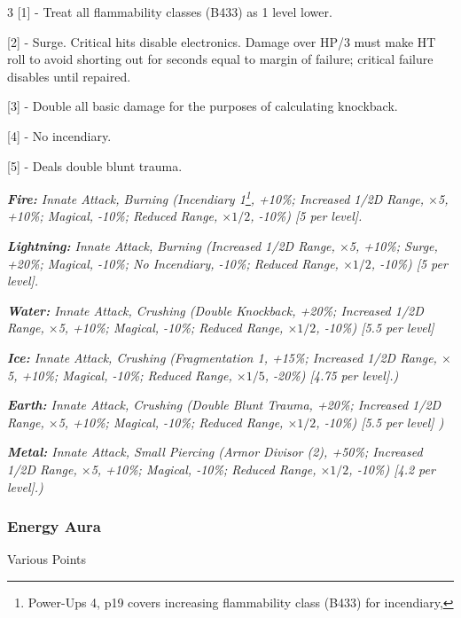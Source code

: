\begin{multicols*}{3}
	[1] - Treat all flammability classes (B433) as 1 level lower.
	
	[2] - Surge. Critical hits disable electronics. Damage over HP/3 must make HT roll to avoid shorting out for seconds equal to margin of failure; critical failure disables until repaired.
	
	[3] - Double all basic damage for the purposes of calculating knockback.
	
	[4] - No incendiary.
	
	[5] - Deals double blunt trauma.
	
	\textcolor{OliveGreen}{\textit{\textbf{Fire:} Innate Attack, Burning (Incendiary 1\footnote{Power-Ups 4, p19 covers increasing flammability class (B433) for incendiary,}, +10\%; Increased 1/2D Range, \(\times\)5, +10\%; Magical, -10\%; Reduced Range, \(\times1/2\), -10\%) [5 per level].}}
	
	\textcolor{OliveGreen}{\textit{\textbf{Lightning:} Innate Attack, Burning (Increased 1/2D Range, \(\times\)5, +10\%; Surge, +20\%; Magical, -10\%; No Incendiary, -10\%; Reduced Range, \(\times1/2\), -10\%) [5 per level].}}
	
	\textcolor{OliveGreen}{\textit{\textbf{Water:} Innate Attack, Crushing (Double Knockback, +20\%; Increased 1/2D Range, \(\times\)5, +10\%; Magical, -10\%; Reduced Range, \(\times1/2\), -10\%) [5.5 per level] }}
	
	\textcolor{OliveGreen}{\textit{\textbf{Ice:} Innate Attack, Crushing (Fragmentation 1, +15\%; Increased 1/2D Range, \(\times\)5, +10\%; Magical, -10\%; Reduced Range, \(\times1/5\), -20\%) [4.75 per level].)}}
	
	\textcolor{OliveGreen}{\textit{\textbf{Earth:} Innate Attack, Crushing (Double Blunt Trauma, +20\%; Increased 1/2D Range, \(\times\)5, +10\%; Magical, -10\%; Reduced Range, \(\times1/2\), -10\%) [5.5 per level] ) }}
	
	\textcolor{OliveGreen}{\textit{\textbf{Metal:} Innate Attack, Small Piercing (Armor Divisor (2), +50\%; Increased 1/2D Range, \(\times\)5, +10\%; Magical, -10\%; Reduced Range, \(\times1/2\), -10\%) [4.2 per level].) }}
	
	
	\subsubsection{Energy Aura}\label{energy_aura}
	\begin{flushright}
		Various Points
	\end{flushright}
	

\end{multicols*}
